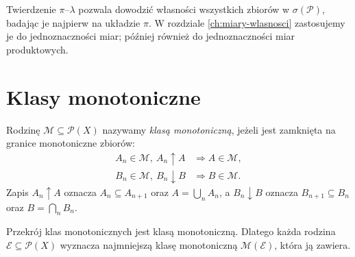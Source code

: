 \begin{uwaga}
Twierdzenie $\pi$--$\lambda$ pozwala dowodzić własności wszystkich
zbiorów w $\sigma(\mathcal P)$, badając je najpierw na układzie
$\pi$. W rozdziale \ref{ch:miary-wlasnosci} zastosujemy je do
jednoznaczności miar; później również do jednoznaczności miar produktowych.
\end{uwaga}

\section{Klasy monotoniczne}

\begin{definicja}
\label{def:monotone-class}
Rodzinę $\mathcal M\subseteq\mathcal P(X)$ nazywamy \emph{klasą
monotoniczną}, jeżeli jest zamknięta na granice monotoniczne zbiorów:
\begin{align*}
A_n\in\mathcal M,\ A_n\uparrow A
&\Longrightarrow A\in\mathcal M,\\
B_n\in\mathcal M,\ B_n\downarrow B
&\Longrightarrow B\in\mathcal M.
\end{align*}
Zapis $A_n\uparrow A$ oznacza $A_n\subseteq A_{n+1}$ oraz
$A=\bigcup_nA_n$, a $B_n\downarrow B$ oznacza
$B_{n+1}\subseteq B_n$ oraz $B=\bigcap_nB_n$.
\end{definicja}

Przekrój klas monotonicznych jest klasą monotoniczną. Dlatego każda
rodzina $\mathcal E\subseteq\mathcal P(X)$ wyznacza najmniejszą klasę
monotoniczną $\mathcal M(\mathcal E)$, która ją zawiera.

